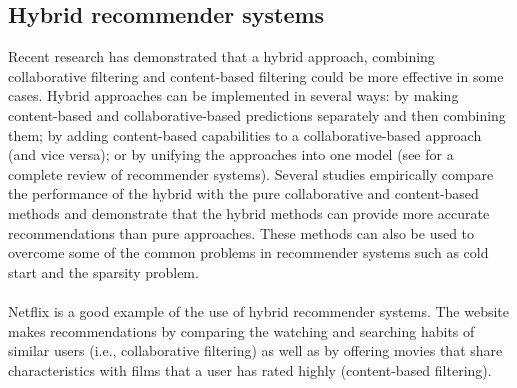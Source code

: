 \documentclass[paper=a4, fontsize=12pt]{scrartcl}
\numberwithin{equation}{section}		%
\numberwithin{figure}{section}			%
\numberwithin{table}{section}				%
\begin{document}
\subsection{Hybrid recommender systems}
Recent research has demonstrated that a hybrid approach, combining collaborative filtering and content-based filtering could be more effective in some cases. Hybrid approaches can be implemented in several ways: by making content-based and collaborative-based predictions separately and then combining them; by adding content-based capabilities to a collaborative-based approach (and vice versa); or by unifying the approaches into one model (see for a complete review of recommender systems). Several studies empirically compare the performance of the hybrid with the pure collaborative and content-based methods and demonstrate that the hybrid methods can provide more accurate recommendations than pure approaches. These methods can also be used to overcome some of the common problems in recommender systems such as cold start and the sparsity problem.
\\
\\
Netflix is a good example of the use of hybrid recommender systems. The website makes recommendations by comparing the watching and searching habits of similar users (i.e., collaborative filtering) as well as by offering movies that share characteristics with films that a user has rated highly (content-based filtering).

\pagebreak
\end{document}
